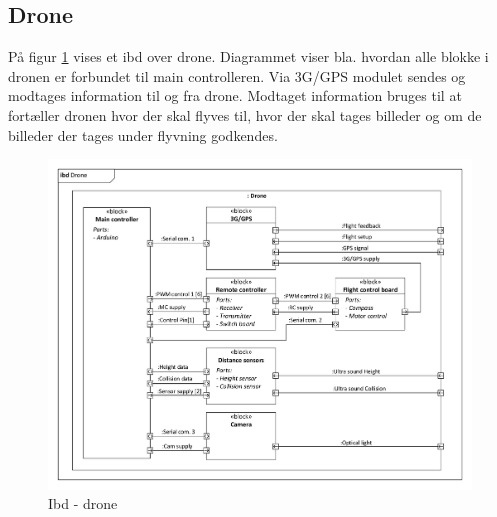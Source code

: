 \subsection{Drone}

På figur \ref{fig:ibd_drone} vises et ibd over drone. Diagrammet viser bla. hvordan alle blokke i dronen er forbundet til main controlleren. Via 3G/GPS modulet sendes og modtages information til og fra drone. Modtaget information bruges til at fortæller dronen hvor der skal flyves til, hvor der skal tages billeder og om de billeder der tages under flyvning godkendes. 

\begin{figure}[H]
\centering
\includegraphics[width=1\textwidth]{Billeder/IBD/ibd2_drone.pdf}
\vspace{-1cm}
\caption{Ibd - drone}
\label{fig:ibd_drone}
\end{figure}


